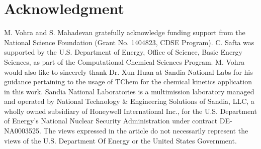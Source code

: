 \section*{Acknowledgment}

M. Vohra and S. Mahadevan gratefully acknowledge funding support from the
National Science Foundation (Grant No. 1404823, CDSE Program). 
C. Safta was supported by the U.S. Department of Energy, Office of Science,
Basic Energy Sciences, as part of the Computational Chemical Sciences Program.
M. Vohra would also like to sincerely thank Dr. Xun Huan at Sandia National Labs for
his guidance pertaining to the usage of TChem for the chemical kinetics application
in this work. Sandia National Laboratories is a multimission laboratory managed 
and operated by National Technology \& Engineering Solutions of Sandia, LLC, 
a wholly owned subsidiary of Honeywell International Inc., for the 
U.S. Department of Energy's National Nuclear Security Administration under contract DE-NA0003525. 
The views expressed in the article do not necessarily represent the
views of the U.S. Department Of Energy or the United States Government.